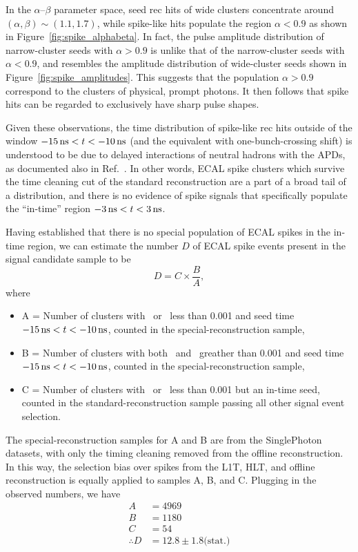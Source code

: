 In the $\alpha$--$\beta$ parameter space, seed rec hits of wide clusters concentrate around $(\alpha, \beta) \sim (1.1, 1.7)$, while spike-like hits populate the region $\alpha < 0.9$ as shown in Figure~\ref{fig:spike_alphabeta}.
In fact, the pulse amplitude distribution of narrow-cluster seeds with $\alpha > 0.9$ is unlike that of the narrow-cluster seeds with $\alpha < 0.9$, and resembles the amplitude distribution of wide-cluster seeds shown in Figure~\ref{fig:spike_amplitudes}.
This suggests that the population $\alpha > 0.9$ correspond to the clusters of physical, prompt photons.
It then follows that spike hits can be regarded to exclusively have sharp pulse shapes.

Given these observations, the time distribution of spike-like rec hits outside of the window $-15\, \text{ns} < t < -10\, \text{ns}$ (and the equivalent with one-bunch-crossing shift) is understood to be due to delayed interactions of neutral hadrons with the APDs, as documented also in Ref.~\cite{CMS_AN_2010-357}. 
In other words, ECAL spike clusters which survive the time cleaning cut of the standard reconstruction are a part of a broad tail of a distribution, and there is no evidence of spike signals that specifically populate the ``in-time'' region $-3\, \text{ns} < t < 3\, \text{ns}$.

Having established that there is no special population of ECAL spikes in the in-time region, we can estimate the number $D$ of ECAL spike events present in the signal candidate sample to be
\begin{equation}
  D = C \times \frac{B}{A},
\end{equation}
where
\begin{itemize}
  \item A = Number of clusters with \sieie\ or \sipip\ less than 0.001 and seed time $-15\, \text{ns} < t < -10\, \text{ns}$, counted in the special-reconstruction sample,
  \item B = Number of clusters with both \sieie\ and \sipip\ greather than 0.001 and seed time $-15\, \text{ns} < t < -10\, \text{ns}$, counted in the special-reconstruction sample, 
  \item C = Number of clusters with \sieie\ or \sipip\ less than 0.001 but an in-time seed, counted in the standard-reconstruction sample passing all other signal event selection.
\end{itemize}

The special-reconstruction samples for A and B are from the SinglePhoton datasets, with only the timing cleaning removed from the offline reconstruction.
In this way, the selection bias over spikes from the L1T, HLT, and offline reconstruction is equally applied to samples A, B, and C. Plugging in the observed numbers, we have
\begin{align*}
  A & = 4969 \\
  B & = 1180 \\
  C & = 54 \\
  \therefore D & = 12.8 \pm 1.8 \text{(stat.)}
\end{align*}

